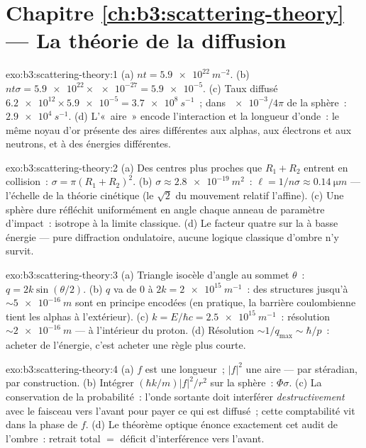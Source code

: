 \section*{Chapitre \ref{ch:b3:scattering-theory} --- La théorie de la diffusion}

\begin{solution}{exo:b3:scattering-theory:1}
(a) $nt = \qty{5.9e22}{m^{-2}}$. (b) $nt\sigma = \num{5.9e22}
\times \num{e-27} = \num{5.9e-5}$. (c) Taux diffusé
$\num{6.2e12} \times \num{5.9e-5} = \qty{3.7e8}{s^{-1}}$~; dans
$\num{e-3}/4\pi$ de la sphère~: $\qty{2.9e4}{s^{-1}}$. (d) L'«~aire~»
encode l'interaction et la longueur d'onde~: le même noyau d'or
présente des aires différentes aux alphas, aux électrons et aux
neutrons, et à des énergies différentes.
\end{solution}

\begin{solution}{exo:b3:scattering-theory:2}
(a) Des centres plus proches que $R_1 + R_2$ entrent en collision~: $\sigma = \pi(R_1 +
R_2)^2$. (b) $\sigma \approx \qty{2.8e-19}{m^2}$~: $\ell = 1/n\sigma
\approx \qty{0.14}{\micro m}$ --- l'échelle de la théorie cinétique
(le $\sqrt2$ du mouvement relatif l'affine). (c) Une sphère dure
réfléchit uniformément en angle chaque anneau de paramètre d'impact~:
isotrope à la limite classique. (d) Le facteur quatre sur la  à basse énergie --- pure diffraction ondulatoire, aucune
logique classique d'ombre n'y survit.
\end{solution}

\begin{solution}{exo:b3:scattering-theory:3}
(a) Triangle isocèle d'angle au sommet $\theta$~: $q =
2k\sin(\theta/2)$. (b) $q$ va de $0$ à $2k = \qty{2e15}{
m^{-1}}$~: des structures jusqu'à $\sim\qty{5e-16}{m}$ sont en
principe encodées (en pratique, la barrière coulombienne tient les
alphas à l'extérieur). (c) $k = E/\hbar c = \qty{2.5e15}{m^{-1}}$~:
résolution $\sim\qty{2e-16}{m}$ --- à l'intérieur du proton. (d)
Résolution $\sim 1/q_{\max} \sim \hbar/p$~: acheter de l'énergie,
c'est acheter une règle plus courte.
\end{solution}

\begin{solution}{exo:b3:scattering-theory:4}
(a) $f$ est une longueur~; $|f|^2$ une aire --- par stéradian, par
construction. (b) Intégrer $(\hbar k/m)|f|^2/r^2$ sur la sphère~:
$\Phi\sigma$. (c) La conservation de la probabilité~: l'onde sortante
doit interférer \emph{destructivement} avec le faisceau vers l'avant
pour payer ce qui est diffusé~; cette comptabilité vit dans la phase
de $f$. (d) Le théorème optique énonce exactement cet audit de
l'ombre~: retrait total $=$ déficit d'interférence vers l'avant.
\end{solution}

